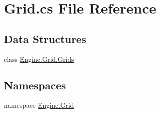 \hypertarget{a00086}{}\section{Grid.\+cs File Reference}
\label{a00086}
\subsection*{Data Structures}
\begin{DoxyCompactItemize}
\item 
class \hyperlink{a00406}{Engine.\+Grid.\+Grids}
\end{DoxyCompactItemize}
\subsection*{Namespaces}
\begin{DoxyCompactItemize}
\item 
namespace \hyperlink{a00251}{Engine.\+Grid}
\end{DoxyCompactItemize}
